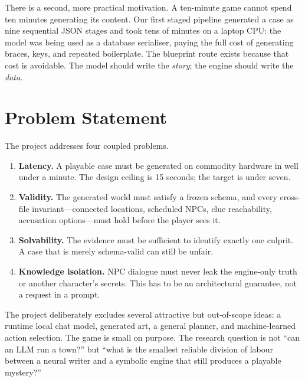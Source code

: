 ﻿\documentclass[11pt,a4paper]{report}
\begin{document}
There is a second, more practical motivation. A ten-minute game cannot spend ten minutes generating its content. Our first staged pipeline generated a case as nine sequential JSON stages and took tens of minutes on a laptop CPU: the model was being used as a database serialiser, paying the full cost of generating braces, keys, and repeated boilerplate. The blueprint route exists because that cost is avoidable. The model should write the \emph{story}; the engine should write the \emph{data}.

\section{Problem Statement}
The project addresses four coupled problems.

\begin{enumerate}
  \item \textbf{Latency.} A playable case must be generated on commodity hardware in well under a minute. The design ceiling is 15 seconds; the target is under seven.
  \item \textbf{Validity.} The generated world must satisfy a frozen schema, and every cross-file invariant---connected locations, scheduled NPCs, clue reachability, accusation options---must hold before the player sees it.
  \item \textbf{Solvability.} The evidence must be sufficient to identify exactly one culprit. A case that is merely schema-valid can still be unfair.
  \item \textbf{Knowledge isolation.} NPC dialogue must never leak the engine-only truth or another character's secrets. This has to be an architectural guarantee, not a request in a prompt.
\end{enumerate}

The project deliberately excludes several attractive but out-of-scope ideas: a runtime local chat model, generated art, a general planner, and machine-learned action selection. The game is small on purpose. The research question is not ``can an LLM run a town?'' but ``what is the smallest reliable division of labour between a neural writer and a symbolic engine that still produces a playable mystery?''
\end{document}

